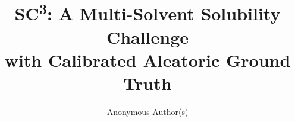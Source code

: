 
\title{SC\textsuperscript{3}: A Multi-Solvent Solubility Challenge\\with Calibrated Aleatoric Ground Truth}

\author{%
  Anonymous Author(s)
}
